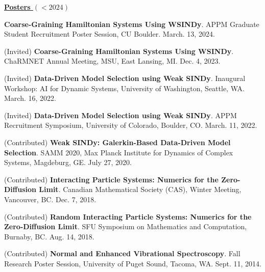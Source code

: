 \documentclass[letterpaper,11pt,oneside]{article}
\newcommand{\headr}[1]{\uline{\Large{\textbf{#1}} \hfill } \\ \vspace{-0.5cm}}
\begin{document}
\headr{Posters $(<2024)$}
\vspace{-0.5cm}
\begin{enumerate}[label={[\arabic*]}]
\item \textbf{Coarse-Graining Hamiltonian Systems Using WSINDy}. APPM Graduate Student Recruitment Poster Session, CU Boulder. March. 13, 2024.
\item (Invited) \textbf{Coarse-Graining Hamiltonian Systems Using WSINDy}. ChaRMNET Annual Meeting, MSU, East Lansing, MI. Dec. 4, 2023.
\item (Invited) \textbf{Data-Driven Model Selection using Weak SINDy}. Inaugural Workshop: AI for Dynamic Systems, University of Washington, Seattle, WA. March. 16, 2022.
\item (Invited) \textbf{Data-Driven Model Selection using Weak SINDy}. APPM Recruitment Symposium, University of Colorado, Boulder, CO. March. 11, 2022.
\item (Contributed) \textbf{Weak SINDy: Galerkin-Based Data-Driven Model Selection}. SAMM 2020, Max Planck Institute for Dynamics of Complex Systems, Magdeburg, GE. July 27, 2020.
\item (Contributed) \textbf{Interacting Particle Systems: Numerics for the Zero-Diffusion Limit}. Canadian Mathematical Society (CAS), Winter Meeting, Vancouver, BC. Dec. 7, 2018.
\item (Contributed) \textbf{Random Interacting Particle Systems: Numerics for the Zero-Diffusion Limit}. SFU Symposium on Mathematics and Computation, Burnaby, BC. Aug. 14, 2018.
\item (Contributed) \textbf{Normal and Enhanced Vibrational Spectroscopy}. Fall Research Poster Session, University of Puget Sound, Tacoma, WA. Sept. 11, 2014.
\end{enumerate}
\end{document}
